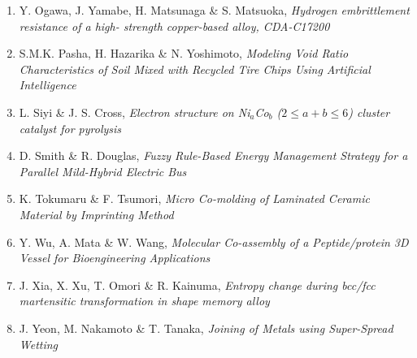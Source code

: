 \begin{enumerate}[label=A\arabic*]
\item  Y. Ogawa, J. Yamabe, H. Matsunaga \& S. Matsuoka, {\em Hydrogen embrittlement resistance of a high-
strength copper-based alloy, CDA-C17200}

\item S.M.K. Pasha, H. Hazarika \& N. Yoshimoto, {\em Modeling Void Ratio Characteristics of Soil
Mixed with Recycled Tire Chips Using Artificial
Intelligence}

\item L. Siyi \& J. S. Cross, {\em Electron structure on Ni$_a$Co$_b$ ($2 \le a+b \le 6$) cluster catalyst for pyrolysis}

\item D. Smith \& R. Douglas, {\em Fuzzy Rule-Based Energy Management Strategy
for a Parallel Mild-Hybrid Electric Bus}

\item K. Tokumaru \& F. Tsumori, {\em Micro Co-molding of Laminated Ceramic
Material by Imprinting Method}

\item Y. Wu, A. Mata \& W. Wang, {\em Molecular Co-assembly of a Peptide/protein 3D
Vessel for Bioengineering Applications}

\item   J. Xia, X. Xu, T. Omori \& R. Kainuma, {\em Entropy change during bcc/fcc martensitic
transformation in  shape memory
alloy}

\item J. Yeon, M. Nakamoto \& T. Tanaka, {\em Joining of Metals using Super-Spread Wetting}


\end{enumerate}
\newpage
{}%
\renewcommand*{\thepage}{A\arabic{page}}
 
 

 

 

 

 

